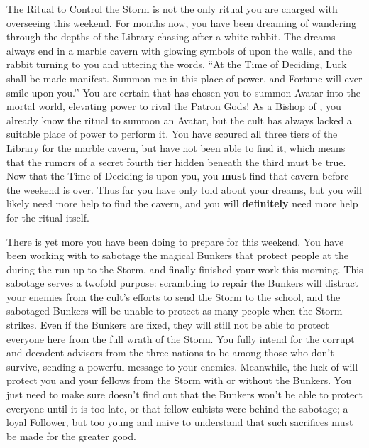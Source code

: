 \documentclass[char]{GL2020}
\begin{document}
The Ritual to Control the Storm is not the only ritual you are charged with overseeing this weekend. For months now, you have been dreaming of wandering through the depths of the Library chasing after a white rabbit. The dreams always end in a marble cavern with glowing symbols of \cGenesis{} upon the walls, and the rabbit turning to you and uttering the words, ``At the Time of Deciding, Luck shall be made manifest. Summon me in this place of power, and Fortune will ever smile upon you.’’ You are certain that \cGenesis{} has chosen you to summon \cGenesis{\their} Avatar into the mortal world, elevating \cGenesis{\their} power to rival the Patron Gods! As a Bishop of \cGenesis{}, you already know the ritual to summon an Avatar, but the cult has always lacked a suitable place of power to perform it. You have scoured all three tiers of the Library for the marble cavern, but have not been able to find it, which means that the rumors of a secret fourth tier hidden beneath the third must be true. Now that the Time of Deciding is upon you, you \textbf{must} find that cavern before the weekend is over. Thus far you have only told \cChupLeader{} about your dreams, but you will likely need more help to find the cavern, and you will \textbf{definitely} need more help for the ritual itself. 

There is yet more you have been doing to prepare for this weekend. You have been working with \cChupInventor{} to sabotage the magical Bunkers that protect people at the \pSchool{} during the run up to the Storm, and finally finished your work this morning. This sabotage serves a twofold purpose: scrambling to repair the Bunkers will distract your enemies from the cult’s efforts to send the Storm to the school, and the sabotaged Bunkers will be unable to protect as many people when the Storm strikes. Even if the Bunkers are fixed, they will still not be able to protect everyone here from the full wrath of the Storm. You fully intend for the corrupt and decadent advisors from the three nations to be among those who don't survive, sending a powerful message to your enemies. Meanwhile, the luck of \cGenesis{} will protect you and your fellows from the Storm with or without the Bunkers. You just need to make sure \cChupStudent{} doesn't find out that the Bunkers won't be able to protect everyone until it is too late, or that \cChupStudent{\their} fellow cultists were behind the sabotage; \cChupStudent{\they} \cChupStudent{\are} a loyal Follower, but too young and naive to understand that such sacrifices must be made for the greater good. 
\end{document}
